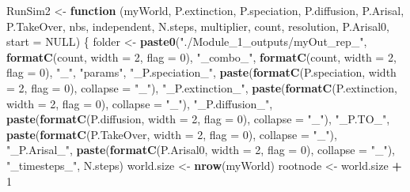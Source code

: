 \documentclass[]{book}
\newenvironment{Shaded}{\begin{snugshade}}{\end{snugshade}}
\newcommand{\KeywordTok}[1]{\textcolor[rgb]{0.13,0.29,0.53}{\textbf{{#1}}}}
\newcommand{\DataTypeTok}[1]{\textcolor[rgb]{0.13,0.29,0.53}{{#1}}}
\newcommand{\DecValTok}[1]{\textcolor[rgb]{0.00,0.00,0.81}{{#1}}}
\newcommand{\StringTok}[1]{\textcolor[rgb]{0.31,0.60,0.02}{{#1}}}
\newcommand{\OtherTok}[1]{\textcolor[rgb]{0.56,0.35,0.01}{{#1}}}
\newcommand{\ControlFlowTok}[1]{\textcolor[rgb]{0.13,0.29,0.53}{\textbf{{#1}}}}
\newcommand{\OperatorTok}[1]{\textcolor[rgb]{0.81,0.36,0.00}{\textbf{{#1}}}}
\newcommand{\NormalTok}[1]{{#1}}
\theoremstyle{definition}
\theoremstyle{definition}
\theoremstyle{remark}
\begin{document}
\begin{Shaded}
\begin{Highlighting}[]
\NormalTok{RunSim2 <-}\StringTok{ }\ControlFlowTok{function}\NormalTok{ (myWorld, P.extinction, P.speciation, P.diffusion, P.Arisal, }
\NormalTok{    P.TakeOver, nbs, independent, N.steps, multiplier, count, }
\NormalTok{    resolution, P.Arisal0, }\DataTypeTok{start =} \OtherTok{NULL}\NormalTok{) }
\NormalTok{\{}
\NormalTok{    folder <-}\StringTok{ }\KeywordTok{paste0}\NormalTok{(}\StringTok{"./Module_1_outputs/myOut_rep_"}\NormalTok{, }\KeywordTok{formatC}\NormalTok{(count, }
        \DataTypeTok{width =} \DecValTok{2}\NormalTok{, }\DataTypeTok{flag =} \DecValTok{0}\NormalTok{), }\StringTok{"_combo_"}\NormalTok{, }\KeywordTok{formatC}\NormalTok{(count, }\DataTypeTok{width =} \DecValTok{2}\NormalTok{, }
        \DataTypeTok{flag =} \DecValTok{0}\NormalTok{), }\StringTok{"_"}\NormalTok{, }\StringTok{"params"}\NormalTok{, }\StringTok{"_P.speciation_"}\NormalTok{, }\KeywordTok{paste}\NormalTok{(}\KeywordTok{formatC}\NormalTok{(P.speciation, }
        \DataTypeTok{width =} \DecValTok{2}\NormalTok{, }\DataTypeTok{flag =} \DecValTok{0}\NormalTok{), }\DataTypeTok{collapse =} \StringTok{"_"}\NormalTok{), }\StringTok{"_P.extinction_"}\NormalTok{, }
        \KeywordTok{paste}\NormalTok{(}\KeywordTok{formatC}\NormalTok{(P.extinction, }\DataTypeTok{width =} \DecValTok{2}\NormalTok{, }\DataTypeTok{flag =} \DecValTok{0}\NormalTok{), }\DataTypeTok{collapse =} \StringTok{"_"}\NormalTok{), }
        \StringTok{"_P.diffusion_"}\NormalTok{, }\KeywordTok{paste}\NormalTok{(}\KeywordTok{formatC}\NormalTok{(P.diffusion, }\DataTypeTok{width =} \DecValTok{2}\NormalTok{, }
            \DataTypeTok{flag =} \DecValTok{0}\NormalTok{), }\DataTypeTok{collapse =} \StringTok{"_"}\NormalTok{), }\StringTok{"_P.TO_"}\NormalTok{, }\KeywordTok{paste}\NormalTok{(}\KeywordTok{formatC}\NormalTok{(P.TakeOver, }
            \DataTypeTok{width =} \DecValTok{2}\NormalTok{, }\DataTypeTok{flag =} \DecValTok{0}\NormalTok{), }\DataTypeTok{collapse =} \StringTok{"_"}\NormalTok{), }\StringTok{"_P.Arisal_"}\NormalTok{, }
        \KeywordTok{paste}\NormalTok{(}\KeywordTok{formatC}\NormalTok{(P.Arisal0, }\DataTypeTok{width =} \DecValTok{2}\NormalTok{, }\DataTypeTok{flag =} \DecValTok{0}\NormalTok{), }\DataTypeTok{collapse =} \StringTok{"_"}\NormalTok{), }
        \StringTok{"_timesteps_"}\NormalTok{, N.steps)}
\NormalTok{    world.size <-}\StringTok{ }\KeywordTok{nrow}\NormalTok{(myWorld)}
\NormalTok{    rootnode <-}\StringTok{ }\NormalTok{world.size }\OperatorTok{+}\StringTok{ }\DecValTok{1}

\end{Highlighting}
\end{Shaded}
\end{document}
